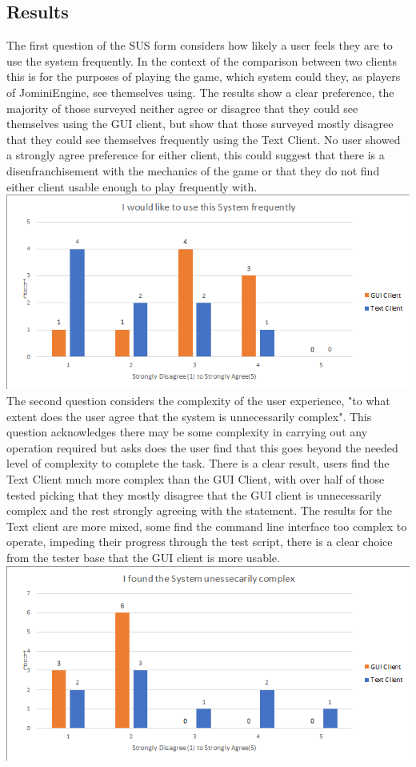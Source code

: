 \documentclass{article}
\begin{document}
\subsection{Results}
The first question of the SUS form considers how likely a user feels they are to use the system frequently. In the context of the comparison between two clients this is for the purposes of playing the game, which system could they, as players of JominiEngine, see themselves using. The results show a clear preference, the majority of those surveyed neither agree or disagree that they could see themselves using the GUI client, but show that those surveyed mostly disagree that they could see themselves frequently using the Text Client. No user showed a strongly agree preference for either client, this could suggest that there is a disenfranchisement with the mechanics of the game or that they do not find either client usable enough to play frequently with. \\
\includegraphics[width=\textwidth]{graph1.PNG}
The second question considers the complexity of the user experience, "to what extent does the user agree that the system is unnecessarily complex". This question acknowledges there may be some complexity in carrying out any operation required but asks does the user find that this goes beyond the needed level of complexity to complete the task. There is a clear result, users find the Text Client much more complex than the GUI Client, with over half of those tested picking that they mostly disagree that the GUI client is unnecessarily complex and the rest strongly agreeing with the statement. The results for the Text client are more mixed, some find the command line interface too complex to operate, impeding their progress through the test script, there is a clear choice from the tester base that the GUI client is more usable.\\
\includegraphics[width=\textwidth]{graph2.PNG}
\end{document}
